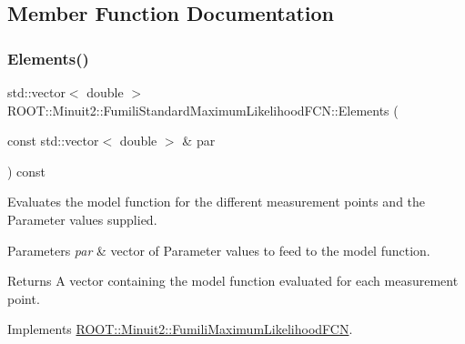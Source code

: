 \subsection{Member Function Documentation}
\mbox{\label{classROOT_1_1Minuit2_1_1FumiliStandardMaximumLikelihoodFCN_a19866fac44787dee8e2a6a35e7a15fe1}} 
\subsubsection{\texorpdfstring{Elements()}{Elements()}\hspace{0.1cm}{\footnotesize\ttfamily [1/3]}}
{\footnotesize\ttfamily std\+::vector$<$ double $>$ R\+O\+O\+T\+::\+Minuit2\+::\+Fumili\+Standard\+Maximum\+Likelihood\+F\+C\+N\+::\+Elements (\begin{DoxyParamCaption}\item[{const std\+::vector$<$ double $>$ \&}]{par }\end{DoxyParamCaption}) const\hspace{0.3cm}{\ttfamily [virtual]}}

Evaluates the model function for the different measurement points and the Parameter values supplied.


\begin{DoxyParams}{Parameters}
{\em par} & vector of Parameter values to feed to the model function.\\
\hline
\end{DoxyParams}
\begin{DoxyReturn}{Returns}
A vector containing the model function evaluated for each measurement point. 
\end{DoxyReturn}


Implements \mbox{\hyperlink{classROOT_1_1Minuit2_1_1FumiliMaximumLikelihoodFCN_a20aa81dc23ba61ed49ba78f4f9627e59}{R\+O\+O\+T\+::\+Minuit2\+::\+Fumili\+Maximum\+Likelihood\+F\+CN}}.

